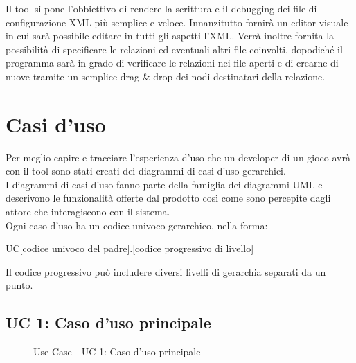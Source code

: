 		Il tool si pone l'obbiettivo di rendere la scrittura e il debugging dei file di configurazione XML più semplice e veloce. Innanzitutto fornirà un editor visuale in cui sarà possibile editare in tutti gli aspetti l'XML. Verrà inoltre fornita la possibilità di specificare le relazioni ed eventuali altri file coinvolti, dopodiché il programma sarà in grado di verificare le relazioni nei file aperti e di crearne di nuove tramite un semplice drag \& drop dei nodi destinatari della relazione.

\section{Casi d'uso}

	Per meglio capire e tracciare l'esperienza d'uso che un developer di un gioco avrà con il tool sono stati creati dei diagrammi di casi d'uso gerarchici.\\
	I diagrammi di casi d'uso fanno parte della famiglia dei diagrammi UML e descrivono le funzionalità offerte dal prodotto così come sono percepite dagli attore che interagiscono con il sistema.\\
	Ogni caso d'uso ha un codice univoco gerarchico, nella forma:
	\begin{center} 
		UC[codice univoco del padre].[codice progressivo di livello]
	\end{center}
	\paragrafo Il codice progressivo può includere diversi livelli di gerarchia separati da un punto.

	\subsection{UC 1: Caso d'uso principale}
		\label{subsec:XEUC1}
		
		\begin{figure}[!h] 
			\centering 
			\caption{Use Case - UC 1: Caso d'uso principale}
		\end{figure}
		
